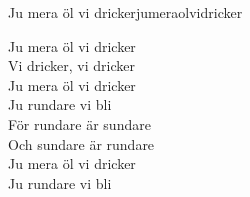 \begin{song}{Ju mera öl vi dricker}{jumeraolvidricker}
\begin{vers}
Ju mera öl vi dricker\\
Vi dricker, vi dricker\\
Ju mera öl vi dricker\\
Ju rundare vi bli\\
För rundare är sundare\\
Och sundare är rundare\\
Ju mera öl vi dricker\\
Ju rundare vi bli\\
\end{vers}
\end{song}
